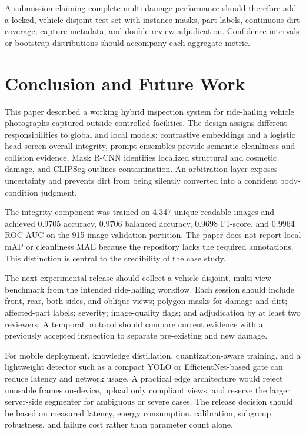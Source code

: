 \documentclass[conference]{IEEEtran}
\begin{document}
A submission claiming complete multi-damage performance should therefore add a locked, vehicle-disjoint test set with instance masks, part labels, continuous dirt coverage, capture metadata, and double-review adjudication. Confidence intervals or bootstrap distributions should accompany each aggregate metric.

\section{Conclusion and Future Work}

This paper described a working hybrid inspection system for ride-hailing vehicle photographs captured outside controlled facilities. The design assigns different responsibilities to global and local models: contrastive embeddings and a logistic head screen overall integrity, prompt ensembles provide semantic cleanliness and collision evidence, Mask R-CNN identifies localized structural and cosmetic damage, and CLIPSeg outlines contamination. An arbitration layer exposes uncertainty and prevents dirt from being silently converted into a confident body-condition judgment.

The integrity component was trained on 4,347 unique readable images and achieved 0.9705 accuracy, 0.9706 balanced accuracy, 0.9698 F1-score, and 0.9964 ROC-AUC on the 915-image validation partition. The paper does not report local mAP or cleanliness MAE because the repository lacks the required annotations. This distinction is central to the credibility of the case study.

The next experimental release should collect a vehicle-disjoint, multi-view benchmark from the intended ride-hailing workflow. Each session should include front, rear, both sides, and oblique views; polygon masks for damage and dirt; affected-part labels; severity; image-quality flags; and adjudication by at least two reviewers. A temporal protocol should compare current evidence with a previously accepted inspection to separate pre-existing and new damage.

For mobile deployment, knowledge distillation, quantization-aware training, and a lightweight detector such as a compact YOLO or EfficientNet-based gate can reduce latency and network usage. A practical edge architecture would reject unusable frames on-device, upload only compliant views, and reserve the larger server-side segmenter for ambiguous or severe cases. The release decision should be based on measured latency, energy consumption, calibration, subgroup robustness, and failure cost rather than parameter count alone.
\end{document}
